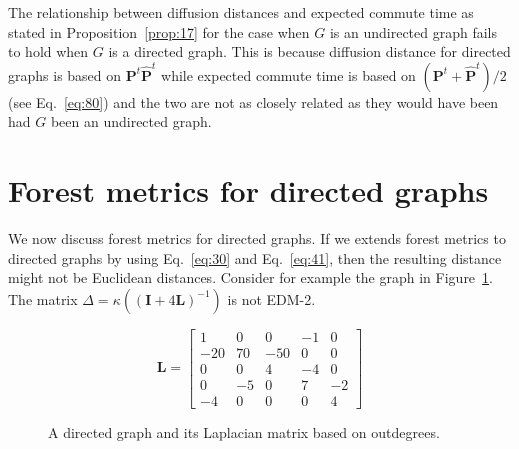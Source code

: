 The relationship between diffusion distances and expected commute time
as stated in Proposition~\ref{prop:17} for the case when $G$ is an
undirected graph fails to hold when $G$ is a directed graph. This is
because diffusion distance for directed graphs is based on
$\mathbf{P}^{t}\hat{\mathbf{P}}^{t}$ while expected commute time is
based on $(\mathbf{P}^{t} + \hat{\mathbf{P}}^{t})/2$ (see
Eq.~\eqref{eq:80}) and the two are not as closely related as they
would have been had $G$ been an undirected graph. 
\section{Forest metrics for directed graphs}
\label{sec:forest-metr-direct}
We now discuss forest metrics
\citep{chebotarev02:_fores_metric_for_graph_vertic} for directed
graphs. If we extends forest metrics to directed graphs by using
Eq.~\eqref{eq:30} and Eq.~\eqref{eq:41}, then the resulting distance
might not be Euclidean distances. Consider for example the graph in
Figure~\ref{fig:directed_graph1}. The matrix $\Delta =
\kappa((\mathbf{I} + 4 \mathbf{L})^{-1})$ is not EDM-2.
\begin{figure}[hbtp]
  \centering
  \begin{minipage}[c]{0.45\textwidth}
    \centering
  \end{minipage}
  \begin{minipage}[c]{0.38\textwidth}
    \begin{equation*}
      \mathbf{L} = \left[ \begin{array}{rrrrr}
          1  & 0  & 0  & -1  & 0 \\
          -20 & 70  & -50  & 0 & 0 \\
          0  & 0 & 4  & -4 & 0 \\
          0 & -5 & 0  & 7 & -2 \\
          -4 & 0 & 0 & 0 & 4
        \end{array} \right ]
    \end{equation*}
  \end{minipage}
  \caption{A directed graph and its Laplacian matrix based on outdegrees.}
  \label{fig:directed_graph1}
\end{figure}
